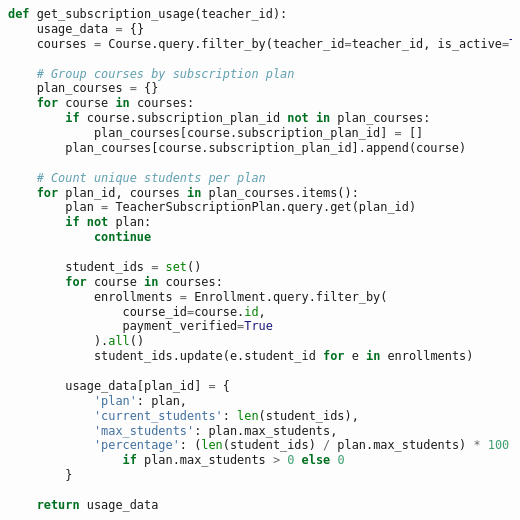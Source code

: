 \begin{lstlisting}[language=Python, caption=Capacity Monitoring, label=lst:capacity-monitoring]
def get_subscription_usage(teacher_id):
    usage_data = {}
    courses = Course.query.filter_by(teacher_id=teacher_id, is_active=True).all()
    
    # Group courses by subscription plan
    plan_courses = {}
    for course in courses:
        if course.subscription_plan_id not in plan_courses:
            plan_courses[course.subscription_plan_id] = []
        plan_courses[course.subscription_plan_id].append(course)
    
    # Count unique students per plan
    for plan_id, courses in plan_courses.items():
        plan = TeacherSubscriptionPlan.query.get(plan_id)
        if not plan:
            continue
        
        student_ids = set()
        for course in courses:
            enrollments = Enrollment.query.filter_by(
                course_id=course.id,
                payment_verified=True
            ).all()
            student_ids.update(e.student_id for e in enrollments)
        
        usage_data[plan_id] = {
            'plan': plan,
            'current_students': len(student_ids),
            'max_students': plan.max_students,
            'percentage': (len(student_ids) / plan.max_students) * 100 
                if plan.max_students > 0 else 0
        }
    
    return usage_data
\end{lstlisting}